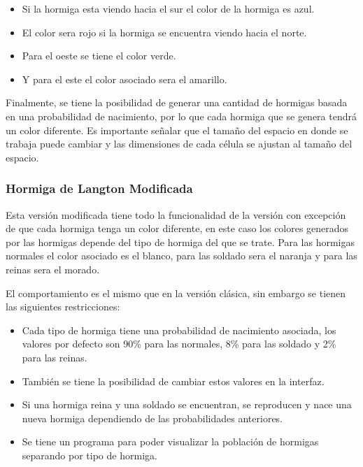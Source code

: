 		\begin{itemize}
		 \item Si la hormiga esta viendo hacia el sur el color de la hormiga es azul.
		 \item El color sera rojo si la hormiga se encuentra viendo hacia el norte.
		 \item Para el oeste se tiene el color verde.
		 \item Y para el este el color asociado sera el amarillo.
		\end{itemize}

		Finalmente, se tiene la posibilidad de generar una cantidad de hormigas basada en una probabilidad de nacimiento, por lo que cada hormiga que se genera tendrá un color diferente. Es importante señalar que el tamaño del espacio en donde se trabaja puede cambiar y las dimensiones de cada célula se ajustan al tamaño del espacio.

	\subsubsection{Hormiga de Langton Modificada}
		Esta versión modificada tiene todo la funcionalidad de la versión con excepción de que cada hormiga tenga un color diferente, en este caso los colores generados por las hormigas depende del tipo de hormiga del que se trate. Para las hormigas normales el color asociado es el blanco, para las soldado sera el naranja y para las reinas sera el morado.

		El comportamiento es el mismo que en la versión clásica, sin embargo se tienen las siguientes restricciones:
		\begin{itemize}
		 \item Cada tipo de hormiga tiene una probabilidad de nacimiento asociada, los valores por defecto son 90\% para las normales, 8\% para las soldado y 2\% para las reinas.
		 \item También se tiene la posibilidad de cambiar estos valores en la interfaz.
		 \item Si una hormiga reina y una soldado se encuentran, se reproducen y nace una nueva hormiga dependiendo de las probabilidades anteriores.
		 \item Se tiene un programa para poder visualizar la población de hormigas separando por tipo de hormiga.
		\end{itemize}